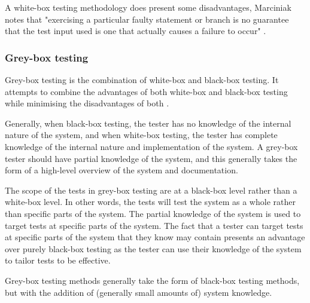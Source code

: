 A white-box testing methodology does present some disadvantages, Marciniak notes that "exercising a particular faulty statement or branch is no guarantee that the test input used is one that actually causes a failure to occur" \cite{enc2}.

\subsubsection{Grey-box testing}

Grey-box testing is the combination of white-box and black-box testing. It attempts to combine the advantages of both white-box and black-box testing while minimising the disadvantages of both \cite{ostrand}.

 Generally, when black-box testing, the tester has no knowledge of the internal nature of the system, and when white-box testing, the tester has complete knowledge of the internal nature and implementation of the system. A grey-box tester should have partial knowledge of the system, and this generally takes the form of a high-level overview of the system and documentation. 

The scope of the tests in grey-box testing are at a black-box level rather than a white-box level. In other words, the tests will test the system as a whole rather than specific parts of the system. The partial knowledge of the system is used to target tests at specific parts of the system. The fact that a tester can target tests at specific parts of the system that they know may contain presents an advantage over purely black-box testing as the tester can use their knowledge of the system to tailor tests to be effective.

Grey-box testing methods generally take the form of black-box testing methods, but with the addition of (generally small amounts of) system knowledge.

